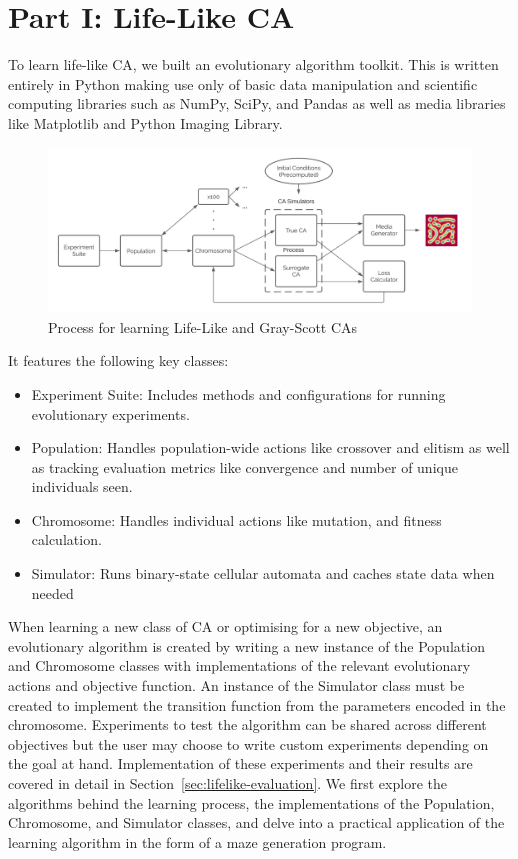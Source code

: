 \chapter{Part I: Life-Like CA} \label{lifelike}

To learn life-like CA, we built an evolutionary algorithm toolkit. This is written entirely in Python making use only of basic data manipulation and scientific computing libraries such as NumPy, SciPy, and Pandas as well as media libraries like Matplotlib and Python Imaging Library.\\

\begin{figure}[!h]
\centering
    \includegraphics[width=\textwidth]{images/dataflow.png}
    \caption{Process for learning Life-Like and Gray-Scott CAs}
\label{fig:dataflow}
\end{figure}

It features the following key classes:
\begin{itemize}
    \item Experiment Suite: Includes methods and configurations for running evolutionary experiments.
    \item Population: Handles population-wide actions like crossover and elitism as well as tracking evaluation metrics like convergence and number of unique individuals seen.
    \item Chromosome: Handles individual actions like mutation, and fitness calculation.
    \item Simulator: Runs binary-state cellular automata and caches state data when needed
\end{itemize}

When learning a new class of CA or optimising for a new objective, an evolutionary algorithm is created by writing a new instance of the Population and Chromosome classes with implementations of the relevant evolutionary actions and objective function. An instance of the Simulator class must be created to implement the transition function from the parameters encoded in the chromosome. Experiments to test the algorithm can be shared across different objectives but the user may choose to write custom experiments depending on the goal at hand. Implementation of these experiments and their results are covered in detail in Section~\ref{sec:lifelike-evaluation}. We first explore the algorithms behind the learning process, the implementations of the Population, Chromosome, and Simulator classes, and delve into a practical application of the learning algorithm in the form of a maze generation program.


